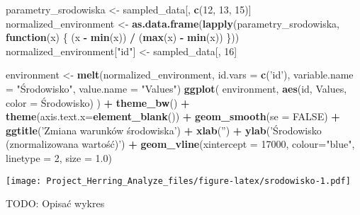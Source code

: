 \documentclass[]{article}
\newenvironment{Shaded}{\begin{snugshade}}{\end{snugshade}}
\newcommand{\ControlFlowTok}[1]{\textcolor[rgb]{0.13,0.29,0.53}{\textbf{#1}}}
\newcommand{\DataTypeTok}[1]{\textcolor[rgb]{0.13,0.29,0.53}{#1}}
\newcommand{\DecValTok}[1]{\textcolor[rgb]{0.00,0.00,0.81}{#1}}
\newcommand{\FloatTok}[1]{\textcolor[rgb]{0.00,0.00,0.81}{#1}}
\newcommand{\KeywordTok}[1]{\textcolor[rgb]{0.13,0.29,0.53}{\textbf{#1}}}
\newcommand{\NormalTok}[1]{#1}
\newcommand{\OperatorTok}[1]{\textcolor[rgb]{0.81,0.36,0.00}{\textbf{#1}}}
\newcommand{\OtherTok}[1]{\textcolor[rgb]{0.56,0.35,0.01}{#1}}
\newcommand{\StringTok}[1]{\textcolor[rgb]{0.31,0.60,0.02}{#1}}
\begin{document}
\begin{Shaded}
\begin{Highlighting}[]
\NormalTok{parametry_srodowiska <-}\StringTok{ }\NormalTok{sampled_data[, }\KeywordTok{c}\NormalTok{(}\DecValTok{12}\NormalTok{, }\DecValTok{13}\NormalTok{, }\DecValTok{15}\NormalTok{)]}
\NormalTok{normalized_environment <-}\StringTok{ }\KeywordTok{as.data.frame}\NormalTok{(}\KeywordTok{lapply}\NormalTok{(parametry_srodowiska, }\ControlFlowTok{function}\NormalTok{(x) \{}
\NormalTok{  (x }\OperatorTok{-}\StringTok{ }\KeywordTok{min}\NormalTok{(x)) }\OperatorTok{/}\StringTok{ }\NormalTok{(}\KeywordTok{max}\NormalTok{(x) }\OperatorTok{-}\StringTok{ }\KeywordTok{min}\NormalTok{(x))}
\NormalTok{\}))}
\NormalTok{normalized_environment[}\StringTok{"id"}\NormalTok{] <-}\StringTok{ }\NormalTok{sampled_data[, }\DecValTok{16}\NormalTok{]}

\NormalTok{environment <-}\StringTok{ }\KeywordTok{melt}\NormalTok{(normalized_environment, }\DataTypeTok{id.vars =} \KeywordTok{c}\NormalTok{(}\StringTok{'id'}\NormalTok{), }\DataTypeTok{variable.name =} \StringTok{"Środowisko"}\NormalTok{, }\DataTypeTok{value.name =} \StringTok{"Values"}\NormalTok{)}
\KeywordTok{ggplot}\NormalTok{(}
\NormalTok{  environment,}
  \KeywordTok{aes}\NormalTok{(id, Values, }\DataTypeTok{color =}\NormalTok{ Środowisko)}
\NormalTok{) }\OperatorTok{+}\StringTok{ }\KeywordTok{theme_bw}\NormalTok{() }\OperatorTok{+}\StringTok{ }
\StringTok{  }\KeywordTok{theme}\NormalTok{(}\DataTypeTok{axis.text.x=}\KeywordTok{element_blank}\NormalTok{()) }\OperatorTok{+}\StringTok{ }\KeywordTok{geom_smooth}\NormalTok{(}\DataTypeTok{se =} \OtherTok{FALSE}\NormalTok{) }\OperatorTok{+}\StringTok{ }\KeywordTok{ggtitle}\NormalTok{(}\StringTok{'Zmiana warunków środowiska'}\NormalTok{) }\OperatorTok{+}\StringTok{  }\KeywordTok{xlab}\NormalTok{(}\StringTok{''}\NormalTok{) }\OperatorTok{+}\StringTok{ }\KeywordTok{ylab}\NormalTok{(}\StringTok{'Środowisko (znormalizowana wartość)'}\NormalTok{) }\OperatorTok{+}\StringTok{ }\KeywordTok{geom_vline}\NormalTok{(}\DataTypeTok{xintercept =} \DecValTok{17000}\NormalTok{, }\DataTypeTok{colour=}\StringTok{"blue"}\NormalTok{, }\DataTypeTok{linetype =} \DecValTok{2}\NormalTok{, }\DataTypeTok{size =} \FloatTok{1.0}\NormalTok{)}
\end{Highlighting}
\end{Shaded}

\texttt{[image: Project\_Herring\_Analyze\_files/figure-latex/srodowisko-1.pdf]}

TODO: Opisać wykres
\end{document}
